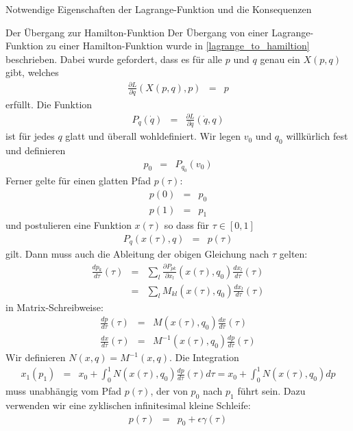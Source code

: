 \begin{chapter}{\titlestr}
\begin{appendix}
\begin{section}{Notwendige Eigenschaften der Lagrange-Funktion und die Konsequenzen}
\begin{subsection}{Der Übergang zur Hamilton-Funktion}
Der Übergang von einer Lagrange-Funktion zu einer Hamilton-Funktion wurde in \ref{lagrange_to_hamiltion} beschrieben. Dabei wurde gefordert, dass es für alle $p$ und $q$ genau ein $X(p,q)$ gibt, welches
\begin{eqnarray*}
\frac{\partial L}{\partial \dot{q}}(X(p,q),p) &=& p
\end{eqnarray*}
erfüllt. Die Funktion
\begin{eqnarray*}
P_q(\dot{q}) &=& \frac{\partial L}{\partial \dot{q}}(\dot{q},q)
\end{eqnarray*}
ist für jedes $q$ glatt und überall wohldefiniert. Wir legen $v_0$ und $q_0$ willkürlich fest und definieren
\begin{eqnarray*}
p_0 &=& P_{q_0}(v_0)
\end{eqnarray*}
Ferner gelte für einen glatten Pfad $p(\tau)$:
\begin{eqnarray*}
p(0) &=& p_0\\
p(1) &=& p_1
\end{eqnarray*}
und postulieren eine Funktion $x(\tau)$ so dass für $\tau\in[0,1]$
\begin{eqnarray*}
P_q(x(\tau),q) &=& p(\tau)
\end{eqnarray*}
gilt. Dann muss auch die Ableitung der obigen Gleichung nach $\tau$ gelten:
\begin{eqnarray*}
\frac{dp_k}{d\tau}(\tau) &=& \sum_l\frac{\partial P_{pk}}{\partial x_l}(x(\tau),q_0)\frac{dx_l}{d\tau}(\tau)\\
&=&\sum_lM_{kl}(x(\tau),q_0)\frac{dx_l}{d\tau}(\tau)
\end{eqnarray*}
in Matrix-Schreibweise:
\begin{eqnarray*}
\frac{dp}{d\tau}(\tau) &=&M(x(\tau),q_0)\frac{dx}{d\tau}(\tau)\\
\frac{dx}{d\tau}(\tau) &=& M^{-1}(x(\tau),q_0)\frac{dp}{d\tau}(\tau)
\end{eqnarray*}
Wir definieren $N(x,q)=M^{-1}(x,q)$. Die Integration
\begin{eqnarray}
\label{p_x_integral}
x_1(p_1) &=& x_0+\int_0^1 N(x(\tau),q_0)\frac{dp}{d\tau}(\tau)d\tau=x_0+\int_0^1 N(x(\tau),q_0)dp
\end{eqnarray}
muss unabhängig vom Pfad $p(\tau)$, der von $p_0$ nach $p_1$ führt sein. Dazu verwenden wir eine zyklischen infinitesimal kleine Schleife:
\begin{eqnarray*}
p(\tau) &=& p_0 +\epsilon \gamma(\tau)
\end{eqnarray*}

\end{subsection}
\end{section}
\end{appendix}
\end{chapter}
